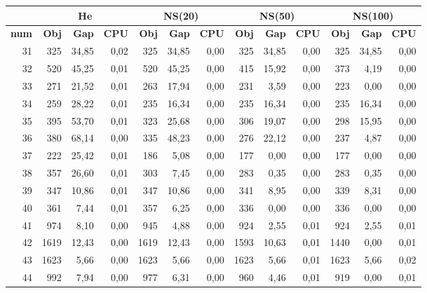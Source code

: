 \begin{table}[H]
	\centering
	\small
	\begin{tabular}{|r|rrr|rrr|rrr|rrr|}
		\toprule
		\hline
		\rowcolor{cyan}	& \multicolumn{3}{c|}{\textbf{He}}&\multicolumn{3}{c|}{\textbf{NS(20)}}&\multicolumn{3}{c|}{\textbf{NS(50)}}&\multicolumn{3}{c|}{\textbf{NS(100)}} \\ \hline
		\midrule
		\rowcolor{cyan}	\textbf{num} & \textbf{Obj}& \textbf{Gap}  & \textbf{CPU} & \textbf{Obj}& \textbf{Gap}  & \textbf{CPU} & \textbf{Obj}& \textbf{Gap}  & \textbf{CPU} & \textbf{Obj}&\textbf{Gap}  & \textbf{CPU} \\ \hline
		\midrule
		31	&	325	&	34,85	&	0,02	&	325	&	34,85	&	0,00	&	325	&	34,85	&	0,00	&	325	&	34,85	&	0,00	\\ \hline
		32	&	520	&	45,25	&	0,01	&	520	&	45,25	&	0,00	&	415	&	15,92	&	0,00	&	373	&	4,19	&	0,00	\\ \hline
		33	&	271	&	21,52	&	0,01	&	263	&	17,94	&	0,00	&	231	&	3,59	&	0,00	&	223	&	0,00	&	0,00	\\ \hline
		34	&	259	&	28,22	&	0,01	&	235	&	16,34	&	0,00	&	235	&	16,34	&	0,00	&	235	&	16,34	&	0,00	\\ \hline
		35	&	395	&	53,70	&	0,01	&	323	&	25,68	&	0,00	&	306	&	19,07	&	0,00	&	298	&	15,95	&	0,00	\\ \hline
		36	&	380	&	68,14	&	0,00	&	335	&	48,23	&	0,00	&	276	&	22,12	&	0,00	&	237	&	4,87	&	0,00	\\ \hline
		37	&	222	&	25,42	&	0,01	&	186	&	5,08	&	0,00	&	177	&	0,00	&	0,00	&	177	&	0,00	&	0,00	\\ \hline
		38	&	357	&	26,60	&	0,01	&	303	&	7,45	&	0,00	&	283	&	0,35	&	0,00	&	283	&	0,35	&	0,00	\\ \hline
		39	&	347	&	10,86	&	0,01	&	347	&	10,86	&	0,00	&	341	&	8,95	&	0,00	&	339	&	8,31	&	0,00	\\ \hline
		40	&	361	&	7,44	&	0,01	&	357	&	6,25	&	0,00	&	336	&	0,00	&	0,00	&	336	&	0,00	&	0,00	\\ \hline
		41	&	974	&	8,10	&	0,00	&	945	&	4,88	&	0,00	&	924	&	2,55	&	0,01	&	924	&	2,55	&	0,01	\\ \hline
		42	&	1619	&	12,43	&	0,00	&	1619	&	12,43	&	0,00	&	1593	&	10,63	&	0,01	&	1440	&	0,00	&	0,01	\\ \hline
		43	&	1623	&	5,66	&	0,00	&	1623	&	5,66	&	0,00	&	1623	&	5,66	&	0,01	&	1623	&	5,66	&	0,02	\\ \hline
		44	&	992	&	7,94	&	0,00	&	977	&	6,31	&	0,00	&	960	&	4,46	&	0,01	&	919	&	0,00	&	0,01	\\ \hline

\end{tabular}
\end{table}
